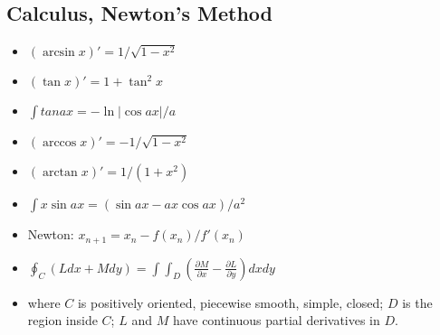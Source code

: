 \documentclass[landscape, 8pt, a4paper, oneside]{extarticle}
\begin{document}
\begin{multicols*}{3}
\subsection{Calculus, Newton's Method}
\begin{itemize}[noitemsep]
    \item $(\arcsin x)'=1/\sqrt{1-x^2}$
    \item $(\tan x)'=1+\tan^2 x$
    \item $\int tan ax=-\ln |\cos ax|/a$
    \item $(\arccos x)'=-1/\sqrt{1-x^2}$
    \item $(\arctan x)'=1/(1+x^2)$
    \item $\int x \sin ax=(\sin ax - ax\cos ax)/a^2$
    \item Newton: $x_{n+1}=x_{n}-f(x_n)/f'(x_n)$
    \item $\oint_C (Ldx+Mdy)=\int\int_D (\frac{\partial M}{\partial x}-\frac{\partial L}{\partial y})dxdy$
    \item where $C$ is positively oriented, piecewise smooth, simple, closed; $D$ is the region inside $C$; $L$ and $M$ have continuous partial derivatives in $D$.
\end{itemize}


\end{multicols*}
\end{document}
